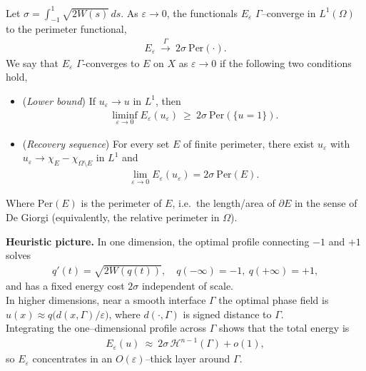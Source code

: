 \begin{theorem}
Let $\sigma = \int_{-1}^1 \sqrt{2W(s)}\,ds$. As $\varepsilon \to 0$, the functionals $E_\varepsilon$ $\Gamma$–converge in $L^1(\Omega)$ to the perimeter functional,
\begin{align*}
E_\varepsilon \ \xrightarrow{\Gamma}\  2\sigma\ \mathrm{Per}(\cdot).
\end{align*}
We say that $E_{\varepsilon}$ $\Gamma$-converges to $E$ on $X$ as $\varepsilon\to 0$ if the following two conditions hold,
\begin{itemize}
    \item (\emph{Lower bound})  
    If $u_\varepsilon \to u$ in $L^1$, then
    \begin{align*}
    \liminf_{\varepsilon \to 0} E_\varepsilon(u_\varepsilon) \ \ge\  2\sigma\ \mathrm{Per}(\{u=1\}).
    \end{align*}
    \item (\emph{Recovery sequence})  For every set $E$ of finite perimeter, there exist $u_\varepsilon$ with $u_\varepsilon \to \chi_E - \chi_{\Omega\setminus E}$ in $L^1$ and
    \begin{align*}
    \lim_{\varepsilon \to 0} E_\varepsilon(u_\varepsilon) =  2\sigma\ \mathrm{Per}(E).
    \end{align*}
\end{itemize}
Where $\mathrm{Per}(E)$ is the perimeter of $E$, i.e.~the length/area of $\partial E$ in the sense of De Giorgi (equivalently, the relative perimeter in $\Omega$).
\end{theorem}

\noindent
\textbf{Heuristic picture.}
In one dimension, the optimal profile connecting $-1$ and $+1$ solves
\begin{align*}
    q'(t) = \sqrt{2W(q(t))}, \quad q(-\infty)=-1,\ q(+\infty)=+1,
\end{align*}
and has a fixed energy cost $2\sigma$ independent of scale.\\
\noindent In higher dimensions, near a smooth interface $\Gamma$ the optimal phase field is $u(x) \approx q\big(d(x,\Gamma)/\varepsilon\big)$, where $d(\cdot,\Gamma)$ is signed distance to $\Gamma$. \\
\noindent Integrating the one–dimensional profile across $\Gamma$ shows that the total energy is
\begin{align*}
E_\varepsilon(u) \ \approx\  2\sigma\,\mathcal{H}^{n-1}(\Gamma) + o(1),
\end{align*}
so $E_\varepsilon$ concentrates in an $O(\varepsilon)$–thick layer around $\Gamma$.

